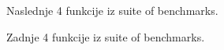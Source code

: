 \documentclass[a4paper]{article}
\begin{document}
\begin{figure}[H]
    \centering
    \caption{Naslednje 4 funkcije iz suite of benchmarks.}
    \label{fig:benchmarks2}
\end{figure}

\begin{figure}[H]
    \centering
    \caption{Zadnje 4 funkcije iz suite of benchmarks.}
    \label{fig:benchmarks3}
\end{figure}
\end{document}
